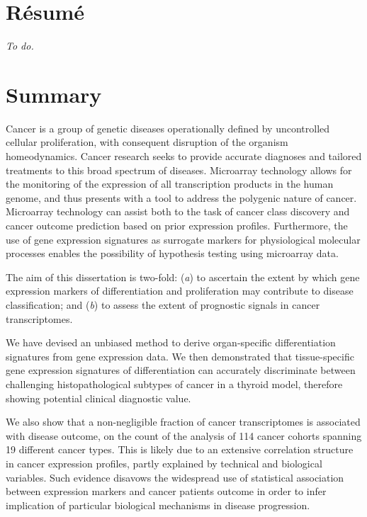 \chapter*{Résumé}
\emph{To do.}
\clearpage
\blankpage
\chapter*{Summary}

Cancer is a group of genetic diseases operationally defined by uncontrolled
cellular proliferation, with consequent disruption of the organism
homeodynamics.  Cancer research seeks to provide accurate diagnoses and tailored
treatments to this broad spectrum of diseases.  Microarray technology allows for
the monitoring of the expression of all transcription products in the human
genome, and thus presents with a tool to address the polygenic nature of cancer.
Microarray technology can assist both to the task of cancer class discovery and
cancer outcome prediction based on prior expression profiles.  Furthermore, the
use of gene expression signatures as surrogate markers for physiological
molecular processes enables the possibility of hypothesis testing using
microarray data.

The aim of this dissertation is two-fold: (\emph{a}) to ascertain the extent by
which gene expression markers of differentiation and proliferation may
contribute to disease classification; and (\emph{b}) to assess the extent of
prognostic signals in cancer transcriptomes.

We have devised an unbiased method to derive organ-specific differentiation
signatures from gene expression data.  We then demonstrated that tissue-specific
gene expression signatures of differentiation can accurately discriminate
between challenging histopathological subtypes of cancer in a thyroid model,
therefore showing potential clinical diagnostic value.

We also show that a non-negligible fraction of cancer transcriptomes is
associated with disease outcome, on the count of the analysis of 114 cancer
cohorts spanning 19 different cancer types.  This is likely due to an extensive
correlation structure in cancer expression profiles, partly explained by
technical and biological variables.  Such evidence disavows the widespread use
of statistical association between expression markers and cancer patients
outcome in order to infer implication of particular biological mechanisms in
disease progression.

